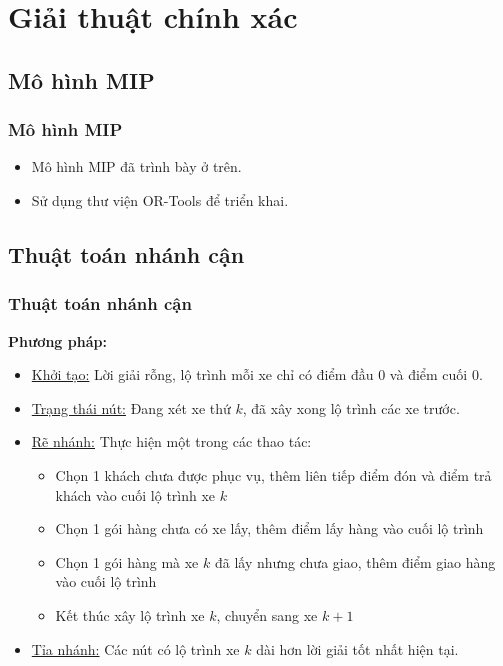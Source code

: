 \documentclass{beamer}
\begin{document}
	
	\section{Giải thuật chính xác}
	
	
	\subsection{Mô hình MIP}
	\begin{frame}
		\frametitle{Mô hình MIP}
		\begin{itemize}
			\item Mô hình MIP đã trình bày ở trên.
			\item Sử dụng thư viện OR-Tools để triển khai.
		\end{itemize}
	\end{frame}

	\subsection{Thuật toán nhánh cận}
	\begin{frame}
		\frametitle{Thuật toán nhánh cận}
		\textbf{Phương pháp:}
		\begin{itemize}
			\item \underline{Khởi tạo:} Lời giải rỗng, lộ trình mỗi xe chỉ có điểm đầu $0$ và điểm cuối $0$.
			\item \underline{Trạng thái nút:} Đang xét xe thứ $k$, đã xây xong lộ trình các xe trước.
			\item {
				\underline{Rẽ nhánh:} Thực hiện một trong các thao tác:
				\begin{itemize}
					\item Chọn 1 khách chưa được phục vụ, thêm liên tiếp điểm đón và điểm trả khách vào cuối lộ trình xe $k$
					\item Chọn 1 gói hàng chưa có xe lấy, thêm điểm lấy hàng vào cuối lộ trình
					\item Chọn 1 gói hàng mà xe $k$ đã lấy nhưng chưa giao, thêm điểm giao hàng vào cuối lộ trình
					\item Kết thúc xây lộ trình xe $k$, chuyển sang xe $k+1$
				\end{itemize}
			}
			\item \underline{Tỉa nhánh:} Các nút có lộ trình xe $k$ dài hơn lời giải tốt nhất hiện tại.
		\end{itemize}
	\end{frame}
	
\end{document}
